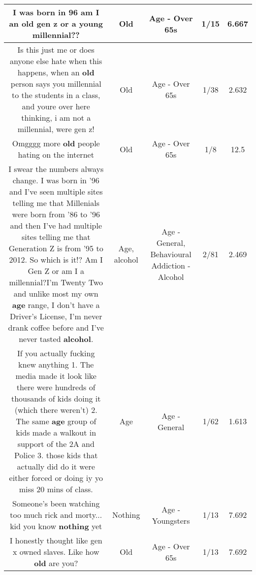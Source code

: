 \documentclass[11pt]{article}
\newlength\mylength
\begin{document}
\begin{center}
\begin{longtable}{|C{.65\mylength}|C{.30\mylength}|C{.12\mylength}|C{.12\mylength}|C{.12\mylength}|}
  \small I was born in 96 am I an \textbf{old} gen z or a young millennial??\normalsize   & Old & Age - Over 65s & 1/15 & 6.667 \\  \hline
  \small Is this just me or does anyone else hate when this happens, when an \textbf{old} person says you millennial to the students in a class, and  youre over here thinking, i am not a millennial, were gen z!\normalsize   & Old & Age - Over 65s & 1/38 & 2.632 \\  \hline
  \small Omgggg more \textbf{old} people hating on the internet\normalsize   & Old & Age - Over 65s & 1/8 & 12.5 \\  \hline
  \small I swear the numbers always change. I was born in '96 and I've seen multiple sites telling me that Millenials were born from '86 to '96 and then I've had multiple sites telling me that Generation Z is from '95 to 2012. So which is it!? Am I Gen Z or am I a millennial?I'm Twenty Two and unlike most my own \textbf{age} range, I don't have a Driver's License, I'm never drank coffee before and I've never tasted \textbf{alcohol}.\normalsize   & Age, alcohol & Age - General, Behavioural Addiction - Alcohol & 2/81 & 2.469 \\  \hline
  \small If you actually fucking knew anything 1. The media made it look like there were hundreds of thousands of kids doing it (which there weren't) 2. The same \textbf{age} group of kids made a walkout in support of the 2A and Police 3. those kids that actually did do it were either forced or doing iy yo miss 20 mins of class.\normalsize   & Age & Age - General & 1/62 & 1.613 \\  \hline
  \small Someone's been watching too much rick and morty... kid you know \textbf{nothing} yet\normalsize   & Nothing & Age - Youngsters & 1/13 & 7.692 \\  \hline
  \small I honestly thought like gen x owned slaves. Like how \textbf{old} are you?\normalsize   & Old & Age - Over 65s & 1/13 & 7.692 \\  \hline

\end{longtable}
\end{center}
\end{document}
